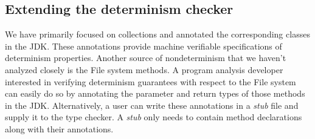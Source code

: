 \subsection{Extending the determinism checker}\label{extending-det-checker}
We have primarily focused on collections and annotated the corresponding classes in the JDK.
These annotations provide machine verifiable specifications of determinism properties.
Another source of nondeterminism that we haven't analyzed closely is the File system methods.
A program analysis developer interested in verifying determinism guarantees with respect to 
the File system can easily do so by annotating the parameter and return types of those methods in the JDK.
Alternatively, a user can write these annotations in a \textit{stub} file and supply it to the type checker. A \textit{stub}
only needs to contain method declarations along with their annotations.
